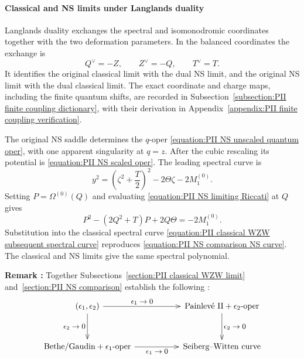 \documentclass[a4paper,11pt]{article}
\numberwithin{equation}{section}
\begin{document}
\paragraph{Classical and NS limits under Langlands duality}
\label{subsection:PII NS comparison classical WZW}

Langlands duality exchanges the
spectral and isomonodromic coordinates together with the two
deformation parameters.  In the balanced coordinates the exchange is
\begin{equation}
	Q^{\vee}=-Z,\qquad Z^{\vee}=-Q,\qquad T^{\vee}=T.
\end{equation}
It identifies the original classical limit with the dual NS limit,
and the original NS limit with the dual classical limit.  The exact
coordinate and charge maps, including the finite quantum shifts,
are recorded in
Subsection~\ref{subsection:PII finite coupling dictionary}, with their
derivation in Appendix~\ref{appendix:PII finite coupling verification}.

The original NS saddle determines the $q$-oper
\eqref{equation:PII NS unscaled quantum oper}, with one apparent
singularity at $q=z$.  After the cubic rescaling its potential is
\eqref{equation:PII NS scaled oper}.  The leading spectral curve is
\begin{equation}
	\label{equation:PII NS comparison NS curve}
	y^{2}=\left(\zeta^{2}+\frac{T}{2}\right)^{2}-2\Theta\zeta-2M_{1}^{(0)}.
\end{equation}
Setting $P=\Omega^{(0)}(Q)$ and evaluating
\eqref{equation:PII NS limiting Riccati} at $Q$ gives
\begin{equation}
	P^{2}-(2Q^{2}+T)P+2Q\Theta=-2M_{1}^{(0)}.
\end{equation}
Substitution into the classical spectral curve
\eqref{equation:PII classical WZW subsequent spectral curve}
reproduces \eqref{equation:PII NS comparison NS curve}.
The classical and NS limits give the same spectral polynomial.

{\bf Remark :}
Together Subsections~\ref{section:PII classical WZW limit} and~\ref{section:PII NS comparison} establish the following :
\begin{equation}
\label{eq:omega_limits}
\begin{tikzcd}[
	column sep=5.5em,
	row sep=3.2em,
	every arrow/.append style={-{Straight Barb[length=2.1mm,width=1.5mm]}},
	every label/.append style={font=\small},
]
	(\epsilon_1,\epsilon_2)
		\arrow[r, "\epsilon_1\to0"]
		\arrow[d, "\epsilon_2\to0"']
	&
	\text{Painlev\'e II}+\epsilon_2\text{-oper}
		\arrow[d, "\epsilon_2\to0"]
	\\
	\text{Bethe/Gaudin}+\epsilon_1\text{-oper}
		\arrow[r, "\epsilon_1\to0"']
	&
	\text{Seiberg--Witten curve}
\end{tikzcd}
\end{equation}
\end{document}

